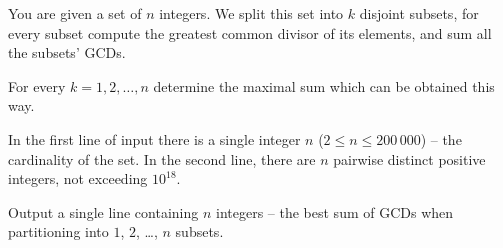 










You are given a set of $n$ integers. We split this set into $k$ disjoint subsets, for every subset compute the greatest common divisor of its elements, and sum all the subsets' GCDs.

For every $k = 1, 2, \ldots, n$ determine the maximal sum which can be obtained this way.


In the first line of input there is a single integer $n$ ($2 \leq n \leq 200\,000$) -- the cardinality of the set. In the second line, there are $n$ pairwise distinct positive integers, not exceeding $10^{18}$.


Output a single line containing $n$ integers -- the best sum of GCDs when partitioning into $1$, $2$, \ldots, $n$ subsets.



\sampleIN

\sampleOUT
\sampleCOMMENT
\sampleEND




